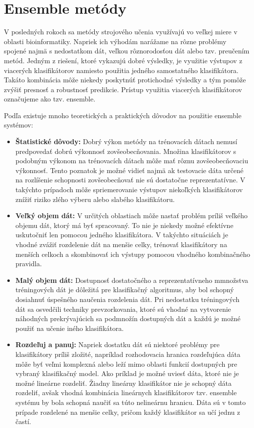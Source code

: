 \chapter{Ensemble metódy}

V posledných rokoch sa metódy strojového učenia využívajú vo veľkej miere v oblasti bioinformatiky. Napriek ich výhodám narážame na rôzne problémy spojené najmä s nedostatkom dát, veľkou rôznorodosťou dát alebo tzv. preučením metód. Jedným z riešení, ktoré vykazujú dobré výsledky, je využitie výstupov z viacerých klasifikátorov namiesto použitia jedného samostatného klasifikátora. Takáto kombinácia môže niekedy poskytnúť protichodné výsledky a tým pomôže zvýšiť presnosť a robustnosť predikcie. Prístup využitia viacerých klasifikátorov označujeme ako tzv. ensemble.

Podľa \cite{polikar} existuje mnoho teoretických a praktických dôvodov na použitie ensemble systémov:
\begin{itemize}
	\item \textbf{Štatistické dôvody:} Dobrý výkon metódy na trénovacích dátach nemusí predpovedať dobrú výkonnosť zovšeobecňovania. Množina klasifikátorov s podobným výkonom na trénovacích dátach môže mať rôznu zovšeobecňovaciu výkonnosť. Tento poznatok je možné vidieť najmä ak testovacie dáta určené na rozlíšenie schopnosti zovšeobecňovať nie sú dostatočne reprezentatívne. V takýchto prípadoch môže spriemerovanie výstupov niekoľkých klasifikátorov znížiť riziko zlého výberu alebo slabého klasifikátoru. 
	\item \textbf{Veľký objem dát:} V určitých oblastiach môže nastať problém príliš veľkého objemu dát, ktorý má byť spracovaný. To nie je niekedy možné efektívne uskutočniť len pomocou jedného klasifikátora. V takýchto situáciách je vhodné zvážiť rozdelenie dát na menšie celky, trénovať klasifikátory na menších celkoch a skombinovať ich výstupy pomocou vhodného kombinačného pravidla.
	\item \textbf{Malý objem dát:} Dostupnosť dostatočného a reprezentatívneho mmnožstva tréningových dát je dôležitá pre klasifikačný algoritmus, aby bol schopný dosiahnuť úspešného naučenia rozdelenia dát. Pri nedostatku tréningových dát sa osvedčili techniky prevzorkovania, ktoré sú vhodné na vytvorenie náhodných prekrývajúcich sa podmnožín dostupných dát a každú je možné použiť na učenie iného klasifikátora.
	\item \textbf{Rozdeľuj a panuj:} Napriek dostatku dát sú niektoré problémy pre klasifikátory príliš zložité, napríklad rozhodovacia hranica rozdeľujúca dáta môže byť veľmi komplexná alebo leží mimo oblasti funkcií dostupných pre vybraný klasifikačný model. Ako príklad je možné uviesť dáta, ktoré nie je možné lineárne rozdeliť. Žiadny lineárny klasifikátor nie je schopný dáta rozdeliť, avšak vhodná kombinácia lineárnych klasifikátorov tzv. ensemble systému by bola schopná naučiť sa túto nelineárnu hranicu. Dáta sú v tomto prípade rozdelené na menšie celky, pričom každý klasifikátor sa učí jednu z častí.
\end{itemize}


